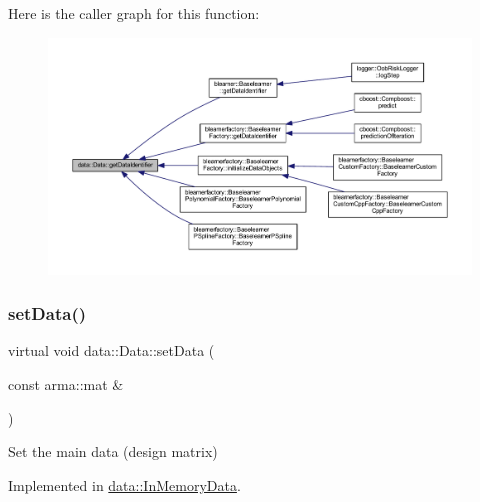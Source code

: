 Here is the caller graph for this function\+:
\nopagebreak
\begin{figure}[H]
\begin{center}
\leavevmode
\includegraphics[width=350pt]{classdata_1_1_data_a1af63a4e5aa708de31e1ffdd727a4e16_icgraph}
\end{center}
\end{figure}
\mbox{\label{classdata_1_1_data_a0e928c49b31f803e7984cc24e2f73f70}} 
\subsubsection{\texorpdfstring{set\+Data()}{setData()}}
{\footnotesize\ttfamily virtual void data\+::\+Data\+::set\+Data (\begin{DoxyParamCaption}\item[{const arma\+::mat \&}]{ }\end{DoxyParamCaption})\hspace{0.3cm}{\ttfamily [pure virtual]}}



Set the main data (design matrix) 



Implemented in \mbox{\hyperlink{classdata_1_1_in_memory_data_a0456d66f7930809211c75bcdd80a7bca}{data\+::\+In\+Memory\+Data}}.

